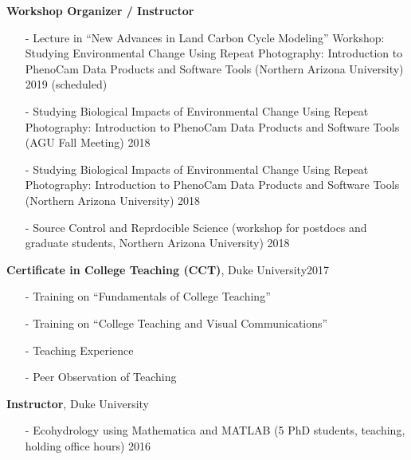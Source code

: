 \documentclass[10pt]{article}
\newenvironment{changemargin}[2]{%
  \begin{list}{}{%
    \setlength{\topsep}{0pt}%
    \setlength{\leftmargin}{#1}%
    \setlength{\rightmargin}{#2}%
    \setlength{\listparindent}{\parindent}%
    \setlength{\itemindent}{\parindent}%
    \setlength{\parsep}{\parskip}%
  }%
  \item[]}{\end{list}
}
\newenvironment{body} {
	\vspace*{-2pt}
	\begin{changemargin}{-0.5in}{-0.5in}
  }
	{\end{changemargin}
}
\begin{document}
\begin{body}
  \textbf {Workshop Organizer / Instructor}\\
	\vspace*{-4pt}
		\begin{itemize} \itemsep -0pt
		
		
		 \item[-] Lecture in ``New Advances in Land Carbon Cycle Modeling'' Workshop: Studying Environmental Change Using Repeat Photography: Introduction to PhenoCam Data Products and Software Tools (Northern Arizona University)  \hfill {2019 (scheduled)}


  		\item[-]Studying Biological Impacts of Environmental Change Using Repeat Photography: Introduction to PhenoCam Data Products and Software Tools (AGU Fall Meeting)  \hfill {2018}
  		
  		\item[-]Studying Biological Impacts of Environmental Change Using Repeat Photography: Introduction to PhenoCam Data Products and Software Tools (Northern Arizona University)  \hfill {2018}
  		
  		\item[-]Source Control and Reprdocible Science (workshop for postdocs and graduate students, Northern Arizona University)  \hfill {2018}
  	\end{itemize}
\medskip


	\textbf{Certificate in College Teaching (CCT)}, Duke University\hfill {2017}\\
		\vspace*{-4pt}
		\begin{itemize} \itemsep -0pt
  		\item[-]Training on ``Fundamentals of College Teaching''\\
  		\item[-]Training on ``College Teaching and Visual Communications''\\
      \item[-]Teaching Experience
      \item[-]Peer Observation of Teaching \\
  	\end{itemize}

	\medskip


  \textbf {Instructor}, Duke University\\
	\vspace*{-4pt}
		\begin{itemize} \itemsep -0pt
  		\item[-]Ecohydrology using Mathematica and MATLAB (5 PhD students, teaching, holding office hours)  \hfill {2016}
  	\end{itemize}
\medskip


\end{body}
\end{document}
